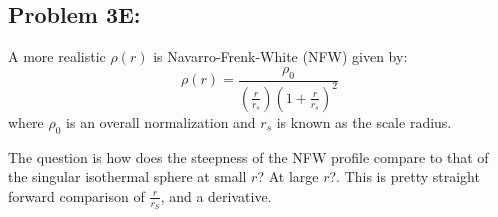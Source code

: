 \subsection*{Problem 3E:}

A more realistic $\rho(r)$ is Navarro-Frenk-White (NFW) given by:
\begin{equation}
    \rho(r) = \frac{\rho_0}{(\frac{r}{r_s})(1 + \frac{r}{r_s})^2}
\end{equation}
where $\rho_0$ is an overall normalization and $r_s$ is known as the scale radius.

The question is how does the steepness of the NFW profile compare to that of the singular isothermal sphere at small
$r$? At large $r$?. This is pretty straight forward comparison of $\frac{r}{r_S}$, and a derivative. 







